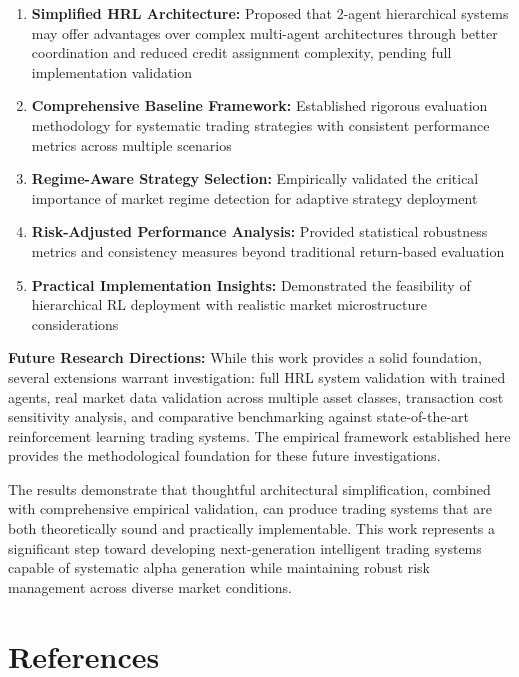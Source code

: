 \documentclass[11pt]{article}
\begin{document}
\begin{enumerate}
\item \textbf{Simplified HRL Architecture:} Proposed that 2-agent hierarchical systems may offer advantages over complex multi-agent architectures through better coordination and reduced credit assignment complexity, pending full implementation validation
\item \textbf{Comprehensive Baseline Framework:} Established rigorous evaluation methodology for systematic trading strategies with consistent performance metrics across multiple scenarios
\item \textbf{Regime-Aware Strategy Selection:} Empirically validated the critical importance of market regime detection for adaptive strategy deployment
\item \textbf{Risk-Adjusted Performance Analysis:} Provided statistical robustness metrics and consistency measures beyond traditional return-based evaluation
\item \textbf{Practical Implementation Insights:} Demonstrated the feasibility of hierarchical RL deployment with realistic market microstructure considerations

\end{enumerate}
\textbf{Future Research Directions:}
While this work provides a solid foundation, several extensions warrant investigation: full HRL system validation with trained agents, real market data validation across multiple asset classes, transaction cost sensitivity analysis, and comparative benchmarking against state-of-the-art reinforcement learning trading systems. The empirical framework established here provides the methodological foundation for these future investigations.

The results demonstrate that thoughtful architectural simplification, combined with comprehensive empirical validation, can produce trading systems that are both theoretically sound and practically implementable. This work represents a significant step toward developing next-generation intelligent trading systems capable of systematic alpha generation while maintaining robust risk management across diverse market conditions.

\section{References}
\end{document}
